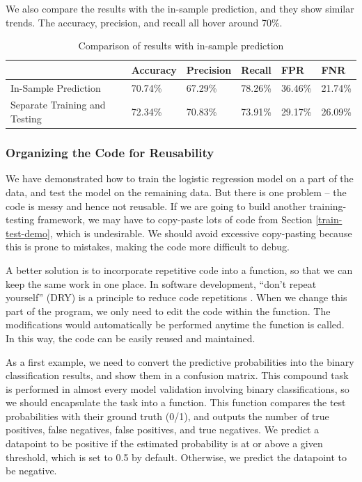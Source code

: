 \documentclass[
]{article}
\begin{document}
We also compare the results with the in-sample prediction, and they show
similar trends. The accuracy, precision, and recall all hover around
70\%.

\begin{table}[ht]
    \centering
    \begin{tabular}{|l|l|l|l|l|l|}
    \hline
    ~                              & Accuracy & Precision & Recall  & FPR     & FNR     \\ \hline
    In-Sample Prediction           & 70.74\%  & 67.29\%   & 78.26\% & 36.46\% & 21.74\% \\ \hline
    Separate Training and Testing  & 72.34\%  & 70.83\%   & 73.91\% & 29.17\% & 26.09\% \\ \hline
    \end{tabular}
    \caption{Comparison of results with in-sample prediction}
    \label{tab:init-train-test}
\end{table}

\hypertarget{org-code-reuse}{%
\subsubsection{Organizing the Code for
Reusability}\label{org-code-reuse}}

We have demonstrated how to train the logistic regression model on a
part of the data, and test the model on the remaining data. But there is
one problem -- the code is messy and hence not reusable. If we are going
to build another training-testing framework, we may have to copy-paste
lots of code from Section \ref{train-test-demo}, which is undesirable.
We should avoid excessive copy-pasting because this is prone to
mistakes, making the code more difficult to debug.

A better solution is to incorporate repetitive code into a function, so
that we can keep the same work in one place. In software development,
``don't repeat yourself'' (DRY) is a principle to reduce code
repetitions \citep{foote2014learning}. When we change this part of the
program, we only need to edit the code within the function. The
modifications would automatically be performed anytime the function is
called. In this way, the code can be easily reused and maintained.

As a first example, we need to convert the predictive probabilities into
the binary classification results, and show them in a confusion matrix.
This compound task is performed in almost every model validation
involving binary classifications, so we should encapsulate the task into
a function. This function compares the test probabilities with their
ground truth (0/1), and outputs the number of true positives, false
negatives, false positives, and true negatives. We predict a datapoint
to be positive if the estimated probability is at or above a given
threshold, which is set to 0.5 by default. Otherwise, we predict the
datapoint to be negative.
\end{document}
